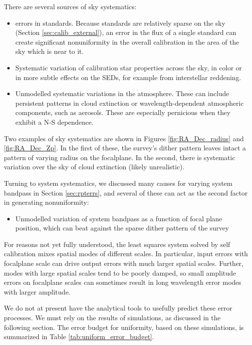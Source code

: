 \documentclass[12pt,preprint]{aastex}
\begin{document}
There are several sources of sky systematics:
\begin{itemize}
\item{errors in standards.  Because standards are relatively sparse on the sky (Section \ref{sec:calib_external}), an error in the flux of a single standard can create significant
nonuniformity in the overall calibration in the area of the sky which is near to it.}
\item{Systematic variation of calibration star properties across the sky, in color or in more subtle effects on the SEDs, for
example from interstellar reddening.}
\item{Unmodelled systematic variations in the atmosphere. These can include persistent patterns in cloud extinction or 
wavelength-dependent atmospheric components, such as aerosols.  These are especially pernicious when they exhibit a N-S
dependence.}
\end{itemize}

Two examples of sky systematics are shown in Figures \ref{fig:RA_Dec_radius} and \ref{fig:RA_Dec_Zp}.  In the first of
these, the survey's dither pattern leaves intact a pattern of varying radius on the focalplane.   In the second, there
is systematic variation over the sky of cloud extinction (likely unrealistic).


Turning to system systematics, we discussed many causes for varying system bandpass in Section \ref{sec:rpterrs}, and several of these can act as the second factor in generating nonuniformity:

\begin{itemize}
\item{Unmodelled variation of system bandpass as a function of focal plane position, which can beat
against the sparse dither pattern of the survey}
\end{itemize}


For reasons not yet fully understood, the least squares system solved by self calibration mixes spatial modes of 
different scales.  In particular, input errors with focalplane scale can drive output errors with much larger
spatial scales.  Further, modes with large spatial scales tend to be poorly damped, so small amplitude errors on
focalplane scales can sometimes result in long wavelength error modes with larger amplitude.

We do not at present have the analytical tools to usefully predict these error processes.  We must rely
on the results of simulations, as discussed in the following section.  The error budget for uniformity,
based on these simulations, is summarized in Table \ref{tab:uniform_error_budget}.
\end{document}
